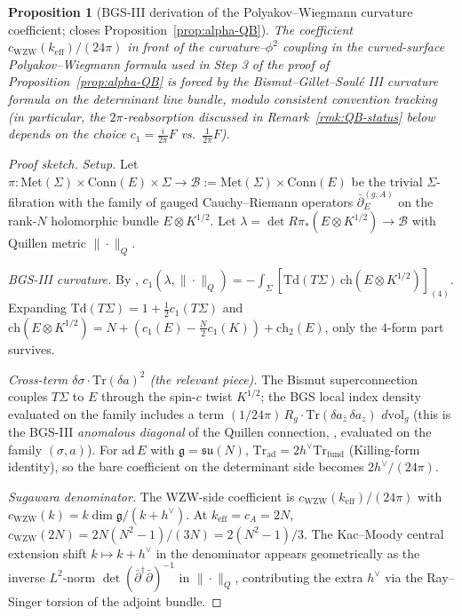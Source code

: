 \documentclass[11pt,letterpaper]{article}
\newtheorem{proposition}[theorem]{Proposition}
\theoremstyle{definition}
\newcommand{\fg}{\mathfrak{g}}
\newcommand{\Tr}{\mathrm{Tr}}
\newcommand{\dvol}{\,d\mathrm{vol}}
\begin{document}
\begin{proposition}[BGS-III derivation of the Polyakov--Wiegmann curvature coefficient; closes Proposition~\ref{prop:alpha-QB}]\label{prop:BGS-PW}
The coefficient $c_{\mathrm{WZW}}(k_{\mathrm{eff}})/(24\pi)$ in front of the curvature--$\phi^2$ coupling in the curved-surface Polyakov--Wiegmann formula used in Step 3 of the proof of Proposition~\ref{prop:alpha-QB} is forced by the Bismut--Gillet--Soul\'e III curvature formula \cite{BismutGilletSoule1988} on the determinant line bundle, modulo consistent convention tracking (in particular, the $2\pi$-reabsorption discussed in Remark~\ref{rmk:QB-status} below depends on the choice $c_1 = \tfrac{i}{2\pi}F$ vs.\ $\tfrac{1}{2\pi}F$).
\end{proposition}

\begin{proof}[Proof sketch]
\emph{Setup.} Let $\pi : \mathrm{Met}(\Sigma) \times \mathrm{Conn}(E) \times \Sigma \to \mathcal{B} := \mathrm{Met}(\Sigma) \times \mathrm{Conn}(E)$ be the trivial $\Sigma$-fibration with the family of gauged Cauchy--Riemann operators $\bar\partial_E^{(g,A)}$ on the rank-$N$ holomorphic bundle $E \otimes K^{1/2}$. Let $\lambda = \det R\pi_*(E \otimes K^{1/2}) \to \mathcal{B}$ with Quillen metric $\|\cdot\|_Q$.

\emph{BGS-III curvature.} By \cite[Thm.\ 0.1]{BismutGilletSoule1988}, $c_1(\lambda, \|\cdot\|_Q) = -\int_\Sigma [\mathrm{Td}(T\Sigma)\,\mathrm{ch}(E \otimes K^{1/2})]_{(4)}$. Expanding $\mathrm{Td}(T\Sigma) = 1 + \tfrac{1}{2}c_1(T\Sigma)$ and $\mathrm{ch}(E \otimes K^{1/2}) = N + (c_1(E) - \tfrac{N}{2}c_1(K)) + \mathrm{ch}_2(E)$, only the $4$-form part survives.

\emph{Cross-term $\delta\sigma \cdot \Tr(\delta a)^2$ (the relevant piece).} The Bismut superconnection couples $T\Sigma$ to $E$ through the spin-$c$ twist $K^{1/2}$; the BGS local index density evaluated on the family includes a term $(1/24\pi)\,R_g \cdot \Tr(\delta a_{\bar z}\,\delta a_z)\,\dvol_g$ (this is the BGS-III \emph{anomalous diagonal} of the Quillen connection, \cite[\S 1.f, Thm.\ 1.27]{BismutGilletSoule1988}, evaluated on the family $(\sigma, a)$). For $\mathrm{ad}\,E$ with $\fg = \mathfrak{su}(N)$, $\Tr_{\mathrm{ad}} = 2h^\vee \Tr_{\mathrm{fund}}$ (Killing-form identity), so the bare coefficient on the determinant side becomes $2h^\vee/(24\pi)$.

\emph{Sugawara denominator.} The WZW-side coefficient is $c_{\mathrm{WZW}}(k_{\mathrm{eff}})/(24\pi)$ with $c_{\mathrm{WZW}}(k) = k\dim\fg/(k+h^\vee)$. At $k_{\mathrm{eff}} = c_A = 2N$, $c_{\mathrm{WZW}}(2N) = 2N(N^2-1)/(3N) = 2(N^2-1)/3$. The Kac--Moody central extension shift $k \mapsto k + h^\vee$ in the denominator appears geometrically as the inverse $L^2$-norm $\det(\bar\partial^\dagger \bar\partial)^{-1}$ in $\|\cdot\|_Q$, contributing the extra $h^\vee$ via the Ray--Singer torsion of the adjoint bundle.


\end{proof}
\end{document}
